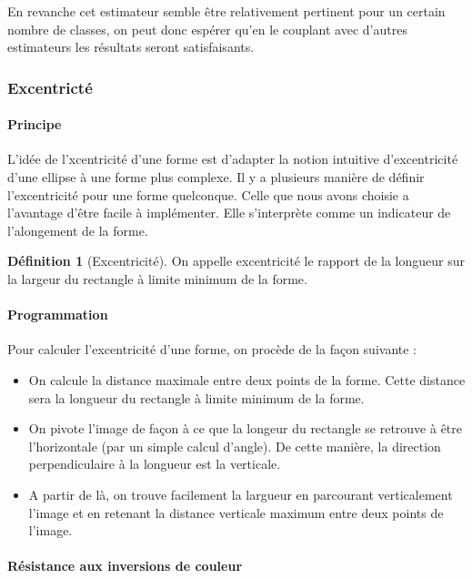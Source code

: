 \documentclass{article}
\theoremstyle{definition}
\newtheorem{definition}{Définition}
\begin{document}
	  En revanche cet estimateur semble être relativement pertinent pour un certain nombre de classes, on peut donc espérer qu'en le couplant avec d'autres estimateurs les résultats seront satisfaisants.  

      \subsubsection{Excentricté}
      
	\paragraph{Principe}
	
	  L'idée de l'xcentricité d'une forme est d'adapter la notion intuitive d'excentricité d'une ellipse à une forme plus complexe. Il y a plusieurs manière de définir l'excentricité pour une forme quelconque. Celle que nous avons choisie a l'avantage d'être facile à implémenter. Elle s'interprète comme un indicateur de l'alongement de la forme.
	  
	  \begin{definition}[Excentricité]
	    On appelle excentricité le rapport de la longueur sur la largeur du rectangle à limite minimum de la forme.
	  \end{definition}
      
	\paragraph{Programmation}
	
	  Pour calculer l'excentricité d'une forme, on procède de la façon suivante :
	  \begin{itemize}
	   \item On calcule la distance maximale entre deux points de la forme. Cette distance sera la longueur du rectangle à limite minimum de la forme.
	   \item On pivote l'image de façon à ce que la longeur du rectangle se retrouve à être l'horizontale (par un simple calcul d'angle). De cette manière, la direction perpendiculaire à la longueur est la verticale.
	   \item A partir de là, on trouve facilement la largueur en parcourant verticalement l'image et en retenant la distance verticale maximum entre deux points de l'image.
	  \end{itemize}
	
	\paragraph{Résistance aux inversions de couleur}
	
\end{document}
